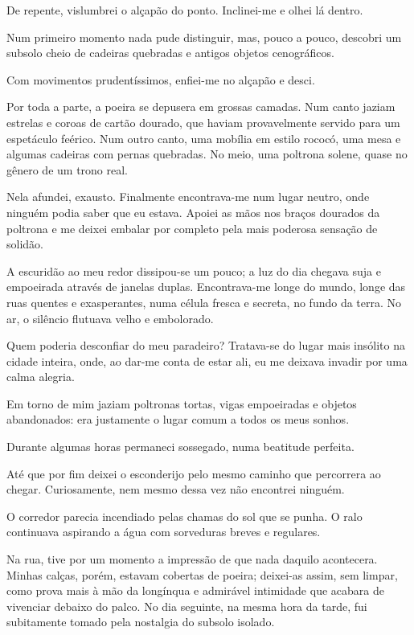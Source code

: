 De repente, vislumbrei o alçapão do ponto. Inclinei-me e olhei lá dentro.

Num primeiro momento nada pude distinguir, mas, pouco a pouco, descobri um subsolo cheio de cadeiras quebradas e antigos objetos cenográficos.

Com movimentos prudentíssimos, enfiei-me no alçapão e desci.

Por toda a parte, a poeira se depusera em grossas camadas. Num canto jaziam estrelas e coroas de cartão dourado, que haviam provavelmente servido para um espetáculo feérico. Num outro canto, uma mobília em estilo rococó, uma mesa e algumas cadeiras com pernas quebradas. No meio, uma poltrona solene, quase no gênero de um trono real.

Nela afundei, exausto. Finalmente encontrava-me num lugar neutro, onde ninguém podia saber que eu estava. Apoiei as mãos nos braços dourados da poltrona e me deixei embalar por completo pela mais poderosa sensação de solidão.

A escuridão ao meu redor dissipou-se um pouco; a luz do dia chegava suja e empoeirada através de janelas duplas. Encontrava-me longe do mundo, longe das ruas quentes e exasperantes, numa célula fresca e secreta, no fundo da terra. No ar, o silêncio flutuava velho e embolorado.

Quem poderia desconfiar do meu paradeiro? Tratava-se do lugar mais insólito na cidade inteira, onde, ao dar-me conta de estar ali, eu me deixava invadir por uma calma alegria.

Em torno de mim jaziam poltronas tortas, vigas empoeiradas e objetos abandonados: era justamente o lugar comum a todos os meus sonhos. 

Durante algumas horas permaneci sossegado, numa beatitude perfeita.

Até que por fim deixei o esconderijo pelo mesmo caminho que percorrera ao chegar. Curiosamente, nem mesmo dessa vez não encontrei ninguém.

O corredor parecia incendiado pelas chamas do sol que se punha. O ralo continuava aspirando a água com sorveduras breves e regulares.

Na rua, tive por um momento a impressão de que nada daquilo acontecera. Minhas calças, porém, estavam cobertas de poeira; deixei-as assim, sem limpar, como prova mais à mão da longínqua e admirável intimidade que acabara de vivenciar debaixo do palco.
No dia seguinte, na mesma hora da tarde, fui subitamente tomado pela nostalgia do subsolo isolado.


